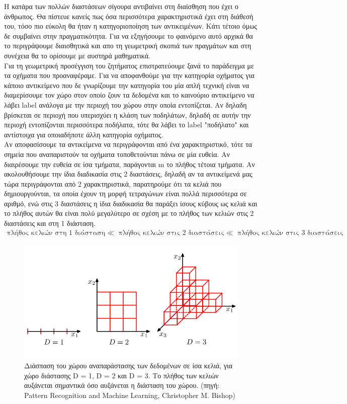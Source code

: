 \documentclass[12pt]{article}
\newenvironment{matlab}
	{\begin{figure}[H]\centering\captionsetup{justification=centering}}
	{\end{figure}}
\begin{document}
Η κατάρα των πολλών διαστάσεων σίγουρα αντιβαίνει στη διαίσθηση που έχει ο άνθρωπος. Θα πίστευε κανείς πως όσα περισσότερα χαρακτηριστικά έχει στη διάθεσή του, τόσο πιο εύκολη θα ήταν η κατηγοριοποίηση των αντικειμένων. Κάτι τέτοιο όμως δε συμβαίνει στην πραγματικότητα. Για να εξηγήσουμε το φαινόμενο αυτό αρχικά θα το περιγράψουμε διαισθητικά και απο τη γεωμετρική σκοπιά των πραγμάτων και στη συνέχεια θα το ορίσουμε με αυστηρά μαθηματικά. \\

Για τη γεωμετρική προσέγγιση του ζητήματος επιστρατεύουμε ξανά το παράδειγμα με τα οχήματα που προαναφέραμε. Για να αποφανθούμε για την κατηγορία οχήματος για κάποιο αντικείμενο που δε γνωρίζουμε την κατηγορία του μία απλή τεχνική είναι να διαμερίσουμε τον χώρο στον οποίο ζουν τα δεδομένα και το καινούριο αντικείμενο να λάβει label ανάλογα με την περιοχή του χώρου στην οποία εντοπίζεται. Αν δηλαδη βρίσκεται σε περιοχή που υπερισχύει η κλάση των ποδηλάτων, δηλαδή σε αυτήν την περιοχή εντοπίζονται περισσότερα ποδήλατα, τότε θα λάβει το label "ποδήλατο" και αντίστοιχα για οποιαδήποτε άλλη κατηγορία οχήματος. \\

Αν αποφασίσουμε τα αντικείμενα να περιγράφονται από ένα χαρακτηριστικό, τότε τα σημεία που αναπαριστούν τα οχήματα τοποθετούνται πάνω σε μία ευθεία. Αν διαιρέσουμε την ευθεία σε ίσα τμήματα, παράγονται m το πλήθος τέτοια τμήματα. Αν ακολουθήσουμε την ίδια διαδικασία στις 2 διαστάσεις, δηλαδή αν τα αντικείμενά μας τώρα περιγράφονται από 2 χαρακτηριστικά, παρατηρούμε ότι τα κελιά που δημιουργούνται, τα οποία έχουν τη μορφή τετραγώνων είναι πολλά περισσότερα σε αριθμό, ενώ στις 3 διαστάσεις η ίδια διαδικασία θα παράξει ίσους κύβους ως κελιά και το πλήθος αυτών θα είναι πολύ μεγαλύτερο σε σχέση με το πλήθος των κελιών στις 2 διαστάσεις και στη 1 διάσταση. \\

\begin{align*}
	\text{πλήθος κελιών στη 1 διάσταση} \ll \text{ πλήθος κελιών στις 2 διαστάσεις} \ll \text{ πλήθος κελιών στις 3 διαστάσεις}
\end{align*}

\begin{matlab}
	\includegraphics[scale=0.6]{images/cells.png}
	\caption{Διάσπαση του χώρου αναπαράστασης των δεδομένων σε ίσα κελιά, για χώρο διάστασης D = 1, D = 2 και D = 3. Το πλήθος των κελιών αυξάνεται σημαντικά όσο αυξάνεται η διάσταση του χώρου. (πηγή: Pattern Recognition and
Machine Learning, Christopher M. Bishop)}
\end{matlab}
\end{document}
